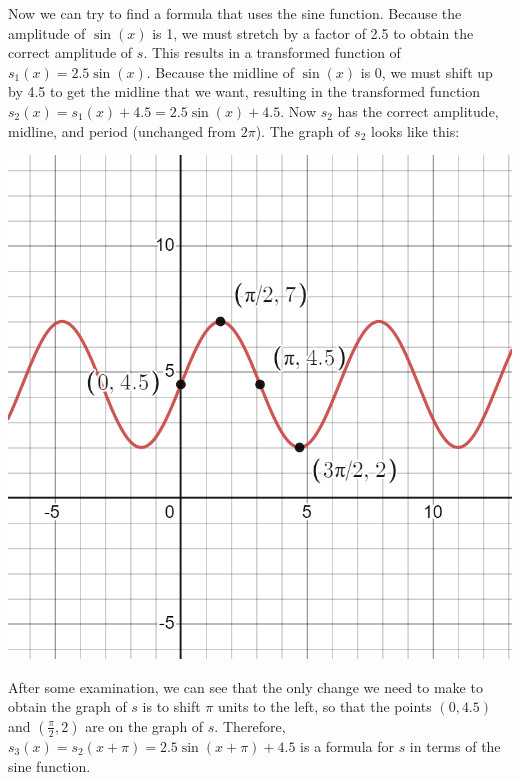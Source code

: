 \documentclass{ximera}
\begin{document}
\begin{example}
\begin{explanation}
Now we can try to find a formula that uses the sine function. Because the amplitude of $\sin(x)$ is 1, we must stretch by a factor of 2.5 to obtain the correct amplitude of $s$. This results in a transformed function of $s_1(x) = 2.5\sin(x)$. Because the midline of $\sin(x)$ is 0, we must shift up by 4.5 to get the midline that we want, resulting in the transformed function $s_2(x) = s_1(x) + 4.5 = 2.5\sin(x) + 4.5$. Now $s_2$ has the correct amplitude, midline, and period (unchanged from $2\pi$). The graph of $s_2$ looks like this:
\begin{image}
\includegraphics[width=0.8\linewidth]{images/spring-ex2.png}
\end{image}

After some examination, we can see that the only change we need to make to obtain the graph of $s$ is to shift $\pi$ units to the left, so that the points $(0, 4.5)$ and $\left(\frac{\pi}{2}, 2\right)$ are on the graph of $s$. Therefore, $s_3(x) = s_2(x + \pi) = 2.5\sin(x + \pi) + 4.5$ is a formula for $s$ in terms of the sine function. 


\end{explanation}
\end{example}
\end{document}

